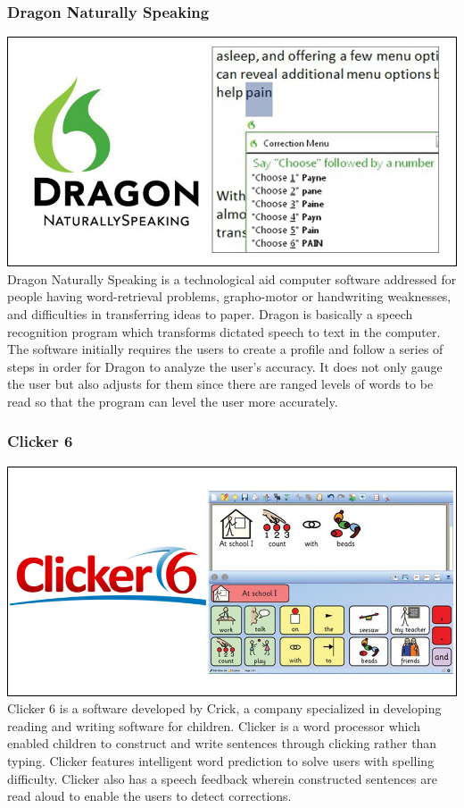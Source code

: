 \documentclass[letterpaper, 12pt, oneside]{book}
\begin{document}
\subsubsection{Dragon Naturally Speaking}
\includegraphics[width=\textwidth]{dragon}
\newline
Dragon Naturally Speaking is a technological aid computer software addressed for people having word-retrieval problems, grapho-motor or handwriting weaknesses, and difficulties in transferring ideas to paper. Dragon is basically a speech recognition program which transforms dictated speech to text in the computer. The software initially requires the users to create a profile and follow a series of steps in order for Dragon to analyze the user’s accuracy. It does not only gauge the user but also adjusts for them since there are ranged levels of words to be read so that the program can level the user more accurately.

\subsubsection{Clicker 6}
\includegraphics[width=\textwidth]{clicker6}
\newline
Clicker 6 is a software developed by Crick, a company specialized in developing reading and writing software for children. Clicker is a word processor which enabled children to construct and write sentences through clicking rather than typing. Clicker features intelligent word prediction to solve users with spelling difficulty. Clicker also has a speech feedback wherein constructed sentences are read aloud to enable the users to detect corrections. 
\end{document}
